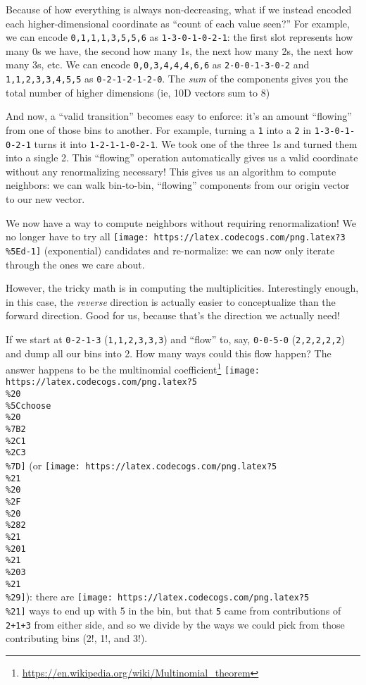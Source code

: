 \documentclass[]{article}
\renewcommand{\href}[2]{#2\footnote{\url{#1}}}
\begin{document}
Because of how everything is always non-decreasing, what if we instead encoded
each higher-dimensional coordinate as ``count of each value seen?'' For example,
we can encode \texttt{0,1,1,1,3,5,5,6} as \texttt{1-3-0-1-0-2-1}: the first slot
represents how many 0s we have, the second how many 1s, the next how many 2s,
the next how many 3s, etc. We can encode \texttt{0,0,3,4,4,4,6,6} as
\texttt{2-0-0-1-3-0-2} and \texttt{1,1,2,3,3,4,5,5} as \texttt{0-2-1-2-1-2-0}.
The \emph{sum} of the components gives you the total number of higher dimensions
(ie, 10D vectors sum to 8)

And now, a ``valid transition'' becomes easy to enforce: it's an amount
``flowing'' from one of those bins to another. For example, turning a \texttt{1}
into a \texttt{2} in \texttt{1-3-0-1-0-2-1} turns it into
\texttt{1-2-1-1-0-2-1}. We took one of the three 1s and turned them into a
single 2. This ``flowing'' operation automatically gives us a valid coordinate
without any renormalizing necessary! This gives us an algorithm to compute
neighbors: we can walk bin-to-bin, ``flowing'' components from our origin vector
to our new vector.

We now have a way to compute neighbors without requiring renormalization! We no
longer have to try all
\texttt{[image: https://latex.codecogs.com/png.latex?3\\\%5Ed-1]} (exponential)
candidates and re-normalize: we can now only iterate through the ones we care
about.

However, the tricky math is in computing the multiplicities. Interestingly
enough, in this case, the \emph{reverse} direction is actually easier to
conceptualize than the forward direction. Good for us, because that's the
direction we actually need!

If we start at \texttt{0-2-1-3} (\texttt{1,1,2,3,3,3}) and ``flow'' to, say,
\texttt{0-0-5-0} (\texttt{2,2,2,2,2}) and dump all our bins into 2. How many
ways could this flow happen? The answer happens to be the
\href{https://en.wikipedia.org/wiki/Multinomial_theorem}{multinomial
coefficient}
\texttt{[image: https://latex.codecogs.com/png.latex?5\\\%20\\\%5Cchoose\\\%20\\\%7B2\\\%2C1\\\%2C3\\\%7D]}
(or
\texttt{[image: https://latex.codecogs.com/png.latex?5\\\%21\\\%20\\\%2F\\\%20\\\%282\\\%21\\\%201\\\%21\\\%203\\\%21\\\%29]}):
there are \texttt{[image: https://latex.codecogs.com/png.latex?5\\\%21]} ways to
end up with 5 in the bin, but that \texttt{5} came from contributions of
\texttt{2+1+3} from either side, and so we divide by the ways we could pick from
those contributing bins (2!, 1!, and 3!).
\end{document}
